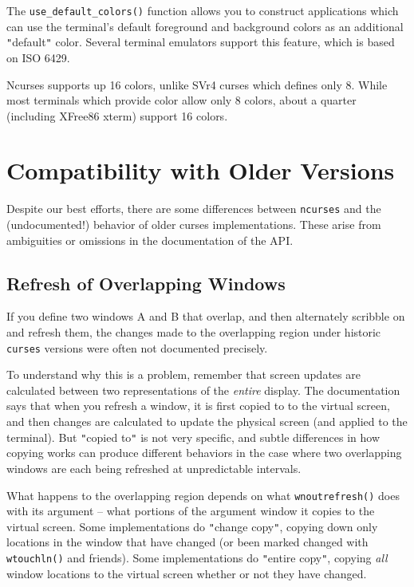 The \texttt{use\_default\_colors()} function allows you to construct
applications which can use the terminal's default foreground and
background colors as an additional {\tt{}"{}}default{\tt{}"{}} color.
Several terminal emulators support this feature, which is based on ISO 6429. 

Ncurses supports up 16 colors, unlike SVr4 curses which defines only 8.
While most terminals which provide color allow only 8 colors, about
a quarter (including XFree86 xterm) support 16 colors.

\section{Compatibility with Older Versions}

\label{f0:compat}Despite our best efforts, there are some differences between \texttt{ncurses}
and the (undocumented!) behavior of older curses implementations.  These arise
from ambiguities or omissions in the documentation of the API.

\subsection{Refresh of Overlapping Windows}

\label{f0:refbug}If you define two windows A and B that overlap, and then alternately scribble
on and refresh them, the changes made to the overlapping region under historic
\texttt{curses} versions were often not documented precisely. 

To understand why this is a problem, remember that screen updates are
calculated between two representations of the \emph{entire} display. The
documentation says that when you refresh a window, it is first copied to to the
virtual screen, and then changes are calculated to update the physical screen
(and applied to the terminal).  But {\tt{}"{}}copied to{\tt{}"{}} is not very specific, and
subtle differences in how copying works can produce different behaviors in the
case where two overlapping windows are each being refreshed at unpredictable
intervals. 

What happens to the overlapping region depends on what \texttt{wnoutrefresh()}
does with its argument -- what portions of the argument window it copies to the
virtual screen.  Some implementations do {\tt{}"{}}change copy{\tt{}"{}}, copying down only
locations in the window that have changed (or been marked changed with
\texttt{wtouchln()} and friends).  Some implementations do  {\tt{}"{}}entire copy{\tt{}"{}},
copying \emph{all} window locations to the virtual screen whether or not
they have changed. 

